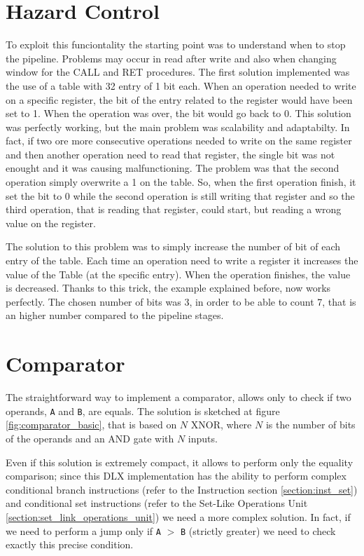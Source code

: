 \section{Hazard Control}
To exploit this funciontality the starting point was to understand when to stop the pipeline. Problems may occur in read after write and also when changing window for the CALL and RET procedures. 
The first solution implemented was the use of a table with 32 entry of 1 bit each. When an operation needed to write on a specific register, the bit of the entry related to the register would have been set to 1. When the operation was over, the bit would go back to 0. This solution was perfectly working, but the main problem was scalability and adaptabilty. In fact, if two ore more consecutive operations needed to write on the same register and then another operation need to read that register, the single bit was not enought and it was causing malfunctioning. The problem was that the second operation simply overwrite a 1 on the table. So, when the first operation finish, it set the bit to 0 while the second operation is still writing that register and so the third operation, that is reading that register, could start, but reading a wrong value on the register. 

The solution to this problem was to simply increase the number of bit of each entry of the table. Each time an operation need to write a register it increases the value of the Table (at the specific entry). When the operation finishes, the value is decreased. Thanks to this trick, the example explained before, now works perfectly. 
The chosen number of bits was 3, in order to be able to count 7, that is an higher number compared to the pipeline stages. 

\section{Comparator}
\label{sec:comparator}
The straightforward way to implement a comparator, allows only to check if two operands, \texttt{A} and \texttt{B}, are equals. The solution is sketched at figure \ref{fig:comparator_basic}, that is based on $N$ XNOR, where $N$ is the number of bits of the operands and an AND gate with $N$ inputs.

Even if this solution is extremely compact, it allows to perform only the equality comparison; since this DLX implementation has the ability to perform complex conditional branch instructions (refer to the Instruction section \ref{section:inst_set}) and conditional set instructions (refer to the Set-Like Operations Unit \ref{section:set_link_operations_unit}) we need a more complex solution. In fact, if we need to perform a jump only if \texttt{A} $>$ \texttt{B} (strictly greater) we need to check exactly this precise condition.

